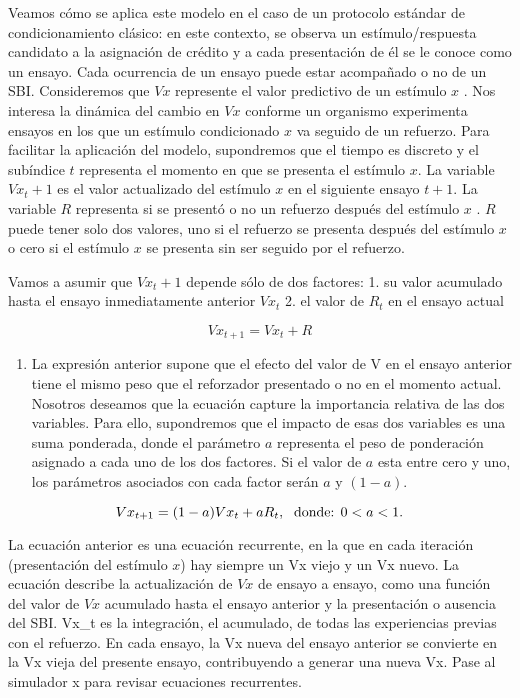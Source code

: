 \documentclass[
  letterpaper,
]{book}
\providecommand{\tightlist}{%
  \setlength{\itemsep}{0pt}\setlength{\parskip}{0pt}}\usepackage{longtable,booktabs,array}
\begin{document}
Veamos cómo se aplica este modelo en el caso de un protocolo estándar de
condicionamiento clásico: en este contexto, se observa un
estímulo/respuesta candidato a la asignación de crédito y a cada
presentación de él se le conoce como un ensayo. Cada ocurrencia de un
ensayo puede estar acompañado o no de un SBI. Consideremos que \(Vx\)
represente el valor predictivo de un estímulo \(x\) . Nos interesa la
dinámica del cambio en \(Vx\) conforme un organismo experimenta ensayos
en los que un estímulo condicionado \(x\) va seguido de un refuerzo.
Para facilitar la aplicación del modelo, supondremos que el tiempo es
discreto y el subíndice \(t\) representa el momento en que se presenta
el estímulo \(x\). La variable \(Vx_t+1\) es el valor actualizado del
estímulo \(x\) en el siguiente ensayo \(t+1\). La variable \(R\)
representa si se presentó o no un refuerzo después del estímulo \(x\) .
\(R\) puede tener solo dos valores, uno si el refuerzo se presenta
después del estímulo \(x\) o cero si el estímulo \(x\) se presenta sin
ser seguido por el refuerzo.

Vamos a asumir que \(Vx_t+1\) depende sólo de dos factores: 1. su valor
acumulado hasta el ensayo inmediatamente anterior \(Vx_t\) 2. el valor
de \(R_t\) en el ensayo actual

\[
Vx_{t+1} = Vx_t + R
\]

\begin{enumerate}
\def\labelenumi{\arabic{enumi}.}
\setcounter{enumi}{2}
\tightlist
\item
  La expresión anterior supone que el efecto del valor de V en el ensayo
  anterior tiene el mismo peso que el reforzador presentado o no en el
  momento actual. Nosotros deseamos que la ecuación capture la
  importancia relativa de las dos variables. Para ello, supondremos que
  el impacto de esas dos variables es una suma ponderada, donde el
  parámetro \(a\) representa el peso de ponderación asignado a cada uno
  de los dos factores. Si el valor de \(a\) esta entre cero y uno, los
  parámetros asociados con cada factor serán \(a\) y \((1-a)\).
\end{enumerate}

\[
Vx_{t+1} = (1-a)Vx_t + aR_t, \hspace{0.1cm} \text{ donde: } 0 < a < 1.
\]

La ecuación anterior es una ecuación recurrente, en la que en cada
iteración (presentación del estímulo \(x\)) hay siempre un Vx viejo y un
Vx nuevo. La ecuación describe la actualización de \(Vx\) de ensayo a
ensayo, como una función del valor de \(Vx\) acumulado hasta el ensayo
anterior y la presentación o ausencia del SBI. Vx\_t es la integración,
el acumulado, de todas las experiencias previas con el refuerzo. En cada
ensayo, la Vx nueva del ensayo anterior se convierte en la Vx vieja del
presente ensayo, contribuyendo a generar una nueva Vx. Pase al simulador
x para revisar ecuaciones recurrentes.
\end{document}
